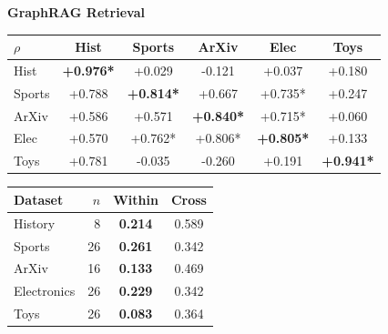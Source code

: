 \begin{table}[htbp]
\vspace{0.5em}

\textbf{GraphRAG Retrieval}

\begin{tabular}[t]{lccccc}
\toprule
$\rho$ & Hist & Sports & ArXiv & Elec & Toys \\
\midrule
Hist  & \textbf{+0.976*} & +0.029\phantom{*} & -0.121\phantom{*} & +0.037\phantom{*} & +0.180\phantom{*} \\
Sports& +0.788\phantom{*} & \textbf{+0.814*} & +0.667\phantom{*} & +0.735* & +0.247\phantom{*} \\
ArXiv & +0.586\phantom{*} & +0.571\phantom{*} & \textbf{+0.840*} & +0.715* & +0.060\phantom{*} \\
Elec  & +0.570\phantom{*} & +0.762* & +0.806* & \textbf{+0.805*} & +0.133\phantom{*} \\
Toys  & +0.781\phantom{*} & -0.035\phantom{*} & -0.260\phantom{*} & +0.191\phantom{*} & \textbf{+0.941*} \\
\bottomrule
\end{tabular}%
\hspace{1.5em}
\begin{tabular}[t]{lrcc}
\toprule
Dataset & $n$ & Within & Cross \\
\midrule
History     & 8 & \textbf{0.214} & 0.589 \\
Sports      & 26 & \textbf{0.261} & 0.342 \\
ArXiv       & 16 & \textbf{0.133} & 0.469 \\
Electronics & 26 & \textbf{0.229} & 0.342 \\
Toys        & 26 & \textbf{0.083} & 0.364 \\
\bottomrule
\end{tabular}

\end{table}
